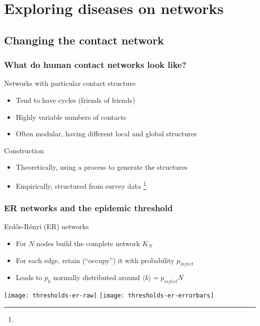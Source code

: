 \documentclass{beamer}
\renewcommand{\cite}[1]{
  \footnote[frame]{\tiny{\bibentry{#1}}}
}
\begin{document}

\section{Exploring diseases on networks}

\subsection{Changing the contact network}

\begin{frame}
  \frametitle{What do human contact networks look like?}

  \begin{block}{Networks with particular contact structure}
    \begin{itemize}
    \item Tend to have cycles (friends of friends)
    \item Highly variable numbers of contacts
    \item Often modular, having different local and global structures 
    \end{itemize}
  \end{block}

  \begin{block}{Construction}
    \begin{itemize}
    \item Theoretically, using a process to generate the structures
    \item Empirically, structured from survey data\cite{Polymod}
    \end{itemize}
  \end{block}
\end{frame}

\begin{frame}
  \frametitle{ER networks and the epidemic threshold}

  \begin{block}{Erd\H{o}s-R\'enyi (ER) networks}
    \begin{itemize}
    \item For $N$ nodes build the complete network $K_N$
    \item For each edge, retain (``occupy'') it with probability
      $p_{infect}$
    \item Leads to $p_k$ normally distributed around $\langle k
      \rangle = p_{infect}N$ 
    \end{itemize}
  \end{block}

  \centering
  \hfill\texttt{[image: thresholds-er-raw]} \hfill
  \texttt{[image: thresholds-er-errorbars]} \hfill~
\end{frame}
\end{document}
